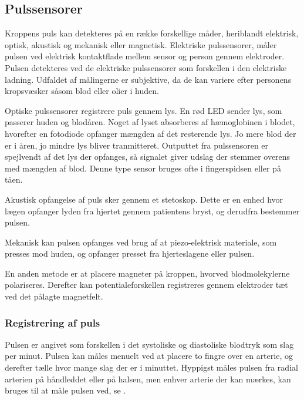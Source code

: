 \subsection{Pulssensorer}
Kroppens puls kan detekteres på en række forskellige måder, heriblandt elektrisk, optisk, akustisk og mekanisk eller magnetisk. 
\newline
Elektriske pulssensorer, måler pulsen ved elektrisk kontaktflade mellem sensor og person gennem elektroder. Pulsen detekteres ved de elektriske pulssensorer som forskellen i den elektriske ladning. Udfaldet af målingerne er subjektive, da de kan variere efter personens kropsvæsker såsom blod eller olier i huden. 

Optiske pulssensorer registrere puls gennem lys. En rød LED sender lys, som passerer huden og blodåren. Noget af lyset absorberes af hæmoglobinen i blodet, hvorefter en fotodiode opfanger mængden af det resterende lys. Jo mere blod der er i åren, jo mindre lys bliver tranmitteret. Outputtet fra pulssensoren er spejlvendt af det lys der opfanges, så signalet giver udslag der stemmer overens med mængden af blod. Denne type sensor bruges ofte i fingerspidsen eller på tåen. 

Akustisk opfangelse af puls sker gennem et stetoskop. Dette er en enhed hvor lægen opfanger lyden fra hjertet gennem patientens bryst, og derudfra bestemmer pulsen. 

Mekanisk kan pulsen opfanges ved brug af at piezo-elektrisk materiale, som presses mod huden, og opfanger presset fra hjerteslagene eller pulsen. 

En anden metode er at placere magneter på kroppen, hvorved blodmolekylerne polariseres. Derefter kan potentialeforskellen registreres gennem elektroder tæt ved det pålagte magnetfelt. 

\subsubsection{Registrering af puls}
Pulsen er angivet som forskellen i det systoliske og diastoliske blodtryk som slag per minut. Pulsen kan måles menuelt ved at placere to fingre over en arterie, og derefter tælle hvor mange slag der er i minuttet. Hyppigst måles pulsen fra radial arterien på håndleddet eller på halsen, men enhver arterie der kan mærkes, kan bruges til at måle pulsen ved, se . 

